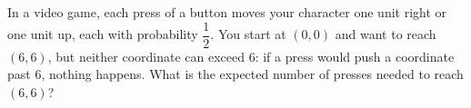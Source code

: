 In a video game, each press of a button moves your character one unit right or one unit up, each with probability $\dfrac{1}{2}$. You start at $(0,0)$ and want to reach $(6,6)$, but neither coordinate can exceed $6$: if a press would push a coordinate past $6$, nothing happens. What is the expected number of presses needed to reach $(6,6)$?
